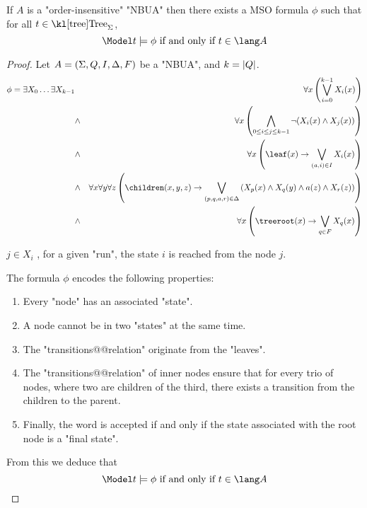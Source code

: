 \documentclass{article}
\begin{document}
\begin{lemma}
	If $A$ is a "order-insensitive" "NBUA"  then there exists a MSO formula $\phi$ such that for all $t \in \tree_{\Sigma}$,
	\[ \Model t \models \phi \tiff t \in \lang A \]
\end{lemma}

\begin{proof}
	Let $A = (\Sigma, Q, I, \Delta, F)$ be a "NBUA", and $k = \left|Q\right|$.
	\begin{eqnarray}
		\phi = \exists X_0 \ldots \exists X_{k-1} &\ & \forall x \left( \bigvee_{i=0}^{k-1} X_i(x) \right) \label{lem:AMSO1} \\
		&\land& \forall x \left( \bigwedge_{0 \leq i \leq j \leq k-1}  \lnot (X_i(x) \land X_j(x)) \right) \label{lem:AMSO2} \\
		&\land& \forall x  \left( \leaf (x) \ra \bigvee_{(a,i)\in I}  X_i(x) \right) \label{lem:AMSO3} \\
		&\land& \forall x \forall y \forall z \left(\children(x,y,z) \ra \bigvee_{(p,q,a,r)\in \Delta} \left(X_p(x) \land X_q(y) \land a(z) \land X_r(z)\right)\right) \label{lem:AMSO4} \\
		&\land& \forall x \left(\treeroot (x) \ra \bigvee_{q \in F} X_q(x) \right) \label{lem:AMSO5}
	\end{eqnarray}


	$j \in X_i$ \tiff, for a given "run", the state $i$ is reached from the node $j$.

	The formula $\phi$ encodes the following properties:

	\begin{enumerate}
		\item Every "node" has an associated "state".
		\item A node cannot be in two "states" at the same time.
		\item The "transitions@@relation" originate from the "leaves".
		\item The "transitions@@relation" of inner nodes ensure that for every trio of nodes, where two are children of the third, there exists a transition from the children to the parent.
		\item Finally, the word is accepted if and only if the state associated with the root node is a "final state".
	\end{enumerate}

	From this we deduce that
	\[ \Model t \models \phi \tiff t \in \lang A \]
\end{proof}
\end{document}
